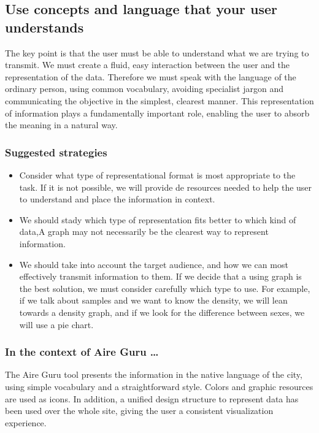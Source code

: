 \subsection{Use concepts and language that your user understands}

The key point is that the user must be able to understand what we are trying to transmit. We must create a fluid, 
easy interaction between the user and the representation of the data. Therefore we must speak with the language of 
the ordinary person, using common vocabulary, avoiding specialist jargon and communicating the objective in the simplest, 
clearest manner. This representation of information plays a fundamentally important role, enabling the user to absorb 
the meaning in a natural way.

\subsubsection*{Suggested strategies} 

\begin{itemize}
    \item Consider what type of representational format is most appropriate to the task. If it is not possible, we will provide de 
    resources needed to help the user to understand and place the information in context. \\

    \item We should stady which type of representation fits better to which kind of data,A graph may not necessarily be the 
    clearest way to represent information.\\

    \item We should take into account the target audience, and how we can most effectively transmit information to them. 
    If we decide that a using graph is the best solution, we must consider carefully which type to use. For example, 
    if we talk about samples and we want to know the density, we will lean towards a density graph, and if we look for the difference
    between sexes, we will use a pie chart.
\end{itemize}

\subsubsection*{In the context of Aire Guru \ldots} 

The Aire Guru tool presents the information in the native language of the city, using simple vocabulary and a 
straightforward style. Colors and graphic resources are used as icons. In addition, a unified design structure to represent data has 
been used over the whole site, giving the user a consistent visualization experience. \\

